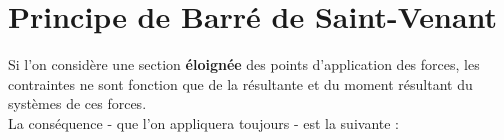 \section{Principe de Barré de Saint-Venant}
Si l'on considère une section \textbf{éloignée} des points d'application 
des forces, les contraintes ne sont fonction que de la résultante et du 
moment résultant du systèmes de ces forces.\\
La conséquence - que l'on appliquera toujours - est la suivante :\\

